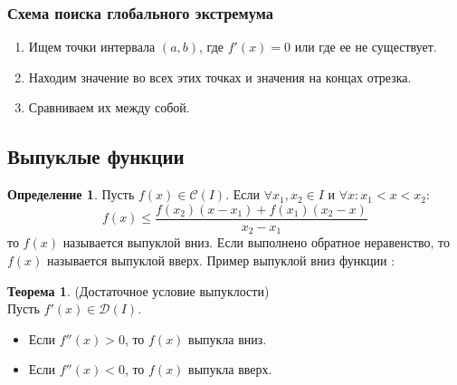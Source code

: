 \documentclass[a4paper, 12pt]{article}
\theoremstyle{definition}
\newtheorem*{definition}{Определение}
\newtheorem*{theorem}{Теорема}
\begin{document}
        \subsubsection*{Схема поиска глобального экстремума}
        \begin{enumerate}
            \item Ищем точки интервала $(a,b)$, где $f'(x)=0$ или где ее не существует. 
            \item Находим значение во всех этих точках и значения на концах отрезка.
            \item Сравниваем их между собой.
        \end{enumerate}
        \subsection{Выпуклые функции}
        \begin{definition}
            Пусть $f(x)\in \mathcal{C}(I)$. Если $\forall x_1,x_2\in I$ и $\forall x: x_1<x<x_2$:
            \[f(x)\leq \frac{f(x_2)(x-x_1)+f(x_1)(x_2-x)}{x_2-x_1}\]
            то $f(x)$ называется выпуклой вниз. Если выполнено обратное неравенство, то $f(x)$ называется выпуклой вверх. Пример выпуклой вниз функции :
        \end{definition} 
        \begin{center}
        \end{center}
        \begin{theorem} (Достаточное условие выпуклости)\\
            Пусть $f'(x)\in \mathcal{D}(I)$.
            \begin{itemize}
                \item Если $f''(x)>0$, то $f(x)$ выпукла вниз.
                \item Если $f''(x)<0$, то $f(x)$ выпукла вверх.
            \end{itemize}
        \end{theorem} 
\end{document}
